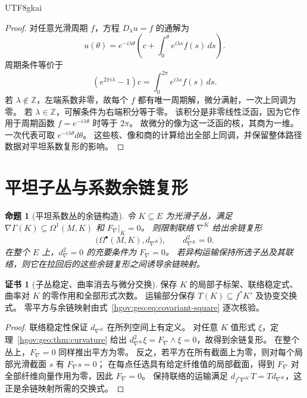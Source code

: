 \documentclass[12pt,a4paper,openany,notitlepage]{report}
\theoremstyle{plain}
\newtheorem{proposition}[theorem]{命题}
\theoremstyle{definition}
\newtheorem*{certificate}{证书}
\theoremstyle{remark}
\begin{document}
\begin{CJK*}{UTF8}{gkai}
\begin{proof}
对任意光滑周期 $f$，方程 $D_\lambda u=f$ 的通解为
\[
u(\theta)=e^{-i\lambda\theta}
\left(c+\int_0^\theta e^{i\lambda s}f(s)\,ds\right).
\]
周期条件等价于
\[
(e^{2\pi i\lambda}-1)c
=\int_0^{2\pi}e^{i\lambda s}f(s)\,ds.
\]
若 $\lambda\notin\mathbb Z$，左端系数非零，故每个 $f$ 都有唯一周期解，微分满射，一次上同调为零。
若 $\lambda\in\mathbb Z$，可解条件为右端积分等于零。
该积分是非零线性泛函，因为它作用于周期函数 $f=e^{-i\lambda\theta}$ 时等于 $2\pi$。
故微分的像为这一泛函的核，其商为一维。
一次代表可取 $e^{-i\lambda\theta}d\theta$。
这些核、像和商的计算给出全部上同调，并保留整体路径数据对平坦系数复形的影响。
\end{proof}

\section{平坦子丛与系数余链复形}
\label{hgov:geo:complexes}

\begin{proposition}[平坦系数丛的余链构造]
\label{hgov:geo:prop:flat-complex}
令 $K\subseteq E$ 为光滑子丛，满足
$\nabla\Gamma(K)\subseteq\Omega^1(M,K)$ 和 $F_\nabla|_K=0$。
则限制联络 $\nabla^K$ 给出余链复形
\[
\bigl(\Omega^\bullet(M,K),d_{\nabla^K}\bigr),
\qquad d_{\nabla^K}^2=0.
\]
在整个 $E$ 上，$d_\nabla^2=0$ 的充要条件为 $F_\nabla=0$。
若异构运输保持所选子丛及其联络，则它在拉回后的这些余链复形之间诱导余链映射。
\end{proposition}

\begin{certificate}[子丛稳定、曲率消去与微分交换]
保存 $K$ 的局部子标架、联络稳定式、曲率对 $K$ 的零作用和全部形式次数。
运输部分保存 $T(K)\subseteq f^*K'$ 及协变交换式。
零平方与余链映射由式~\eqref{hgov:geo:eq:covariant-square} 逐次核验。
\end{certificate}

\begin{proof}
联络稳定性保证 $d_{\nabla^K}$ 在所列空间上有定义。
对任意 $K$ 值形式 $\xi$，定理~\ref{hgov:geo:thm:curvature} 给出
$d_{\nabla^K}^2\xi=F_\nabla\wedge\xi=0$，故得到余链复形。
在整个丛上，$F_\nabla=0$ 同样推出平方为零。
反之，若平方在所有截面上为零，则对每个局部光滑截面 $s$ 有 $F_\nabla s=0$；
在每点任选具有给定纤维值的局部截面，得到 $F_\nabla$ 对全部纤维向量作用为零，因此 $F_\nabla=0$。
保持联络的运输满足
$d_{f^*\nabla^{K'}}T=T d_{\nabla^K}$，这正是余链映射所需的交换式。
\end{proof}


\end{CJK*}
\end{document}
